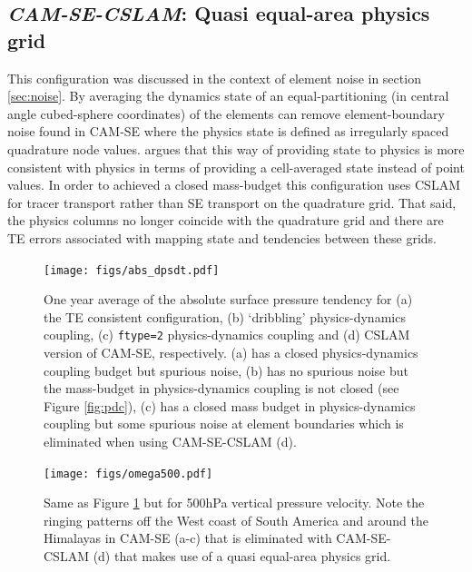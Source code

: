 \documentclass{agujournal}
\begin{document}
\subsection{{\em{CAM-SE-CSLAM}}: Quasi equal-area physics grid}\label{sec:cslam}
This configuration was discussed in the context of element noise in section \ref{sec:noise}. By averaging the dynamics state of an equal-partitioning (in central angle cubed-sphere coordinates) of the elements can remove element-boundary noise found in CAM-SE where the physics state is defined as irregularly spaced quadrature node values. \cite{LetAl2018JAMES} argues that this way of providing state to physics is more consistent with physics in terms of providing a cell-averaged state instead of point values. In order to achieved a closed mass-budget this configuration uses CSLAM for tracer transport rather than SE transport on the quadrature grid. That said, the physics columns no longer coincide with the quadrature grid and there are TE errors associated with mapping state and tendencies between these grids.

{\color{red}{waiting for simulation to finish}}
 \begin{figure}
 \centering
 \texttt{[image: figs/abs\_dpsdt.pdf]}
 \caption{One year average of the absolute surface pressure tendency for (a) the TE consistent configuration, (b) `dribbling' physics-dynamics coupling, (c) {\tt{ftype=2}} physics-dynamics coupling and (d) CSLAM version of CAM-SE, respectively. (a) has a closed physics-dynamics coupling budget but spurious noise, (b) has no spurious noise but the mass-budget in physics-dynamics coupling is not closed (see Figure \ref{fig:pdc}), (c) has a closed mass budget in physics-dynamics coupling but some spurious noise at element boundaries which is eliminated when using CAM-SE-CSLAM (d).}
 \label{fig:abs_dpsdt}
  \end{figure}


 \begin{figure}
 \centering
 \texttt{[image: figs/omega500.pdf]}
 \caption{Same as Figure \ref{fig:abs_dpsdt} but for 500hPa vertical pressure velocity. Note the ringing patterns off the West coast of South America and around the Himalayas in CAM-SE (a-c) that is eliminated with CAM-SE-CSLAM (d) that makes use of a quasi equal-area physics grid.}
 \label{fig:omega500}
  \end{figure}
\end{document}
